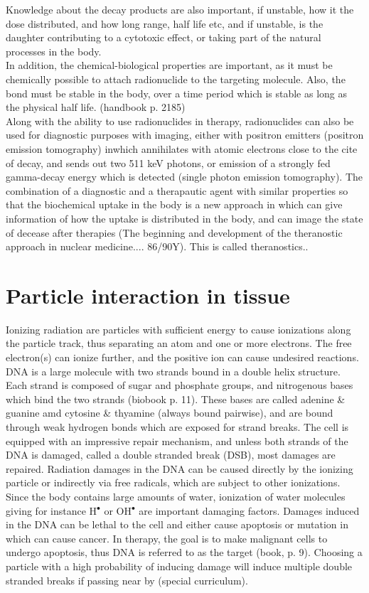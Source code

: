 \documentclass[a4paper,11pt,twoside]{book}
\begin{document}
Knowledge about the decay products are also important, if unstable, how it the dose distributed, and how long range, half life etc, and if unstable, is the daughter contributing to a cytotoxic effect, or taking part of the natural processes in the body. \\

In addition, the chemical-biological properties are important, as it must be chemically possible to attach radionuclide to the targeting molecule. Also, the bond must be stable in the body, over a time period which is stable as long as the physical half life. (handbook p. 2185)\\ 

\noindent
Along with the ability to use radionuclides in therapy, radionuclides can also be used for diagnostic purposes with imaging, either with positron emitters (positron emission tomography) inwhich annihilates with atomic electrons close to the cite of decay, and sends out two 511 keV photons, or emission of a strongly fed gamma-decay energy which is detected (single photon emission tomography). The combination of a diagnostic and a therapautic agent with similar properties so that the biochemical uptake in the body is a new approach in which can give information of how the uptake is distributed in the body, and can image the state of decease after therapies (The beginning and development of the theranostic approach in nuclear medicine.... 86/90Y). This is called theranostics.. 

\section{Particle interaction in tissue}

Ionizing radiation are particles with sufficient energy to cause ionizations along the particle track, thus separating an atom and one or more electrons. The free electron(s) can ionize further, and the positive ion can cause undesired reactions. DNA is a large molecule with two strands bound in a double helix structure. Each strand is composed of sugar and phosphate groups, and nitrogenous bases which bind the two strands (biobook p. 11). These  bases are called adenine \& guanine amd cytosine \& thyamine (always bound pairwise), and are bound through weak hydrogen bonds which are exposed for strand breaks. The cell is equipped with an impressive repair mechanism, and unless both strands of the DNA is damaged, called a double stranded break (DSB), most damages are repaired. Radiation damages in the DNA can be caused directly by the ionizing particle or indirectly via free radicals, which are subject to other ionizations. Since the body contains large amounts of water, ionization of water molecules giving for instance H$^\bullet$ or OH$^\bullet$ are important damaging factors. Damages induced in the DNA can be lethal to the cell and either cause apoptosis or mutation in which can cause cancer. In therapy, the goal is to make malignant cells to undergo apoptosis, thus DNA is referred to as the target (book, p. 9). Choosing a particle with a high probability of inducing damage will induce multiple double stranded breaks if passing near by (special curriculum). 
\end{document}
